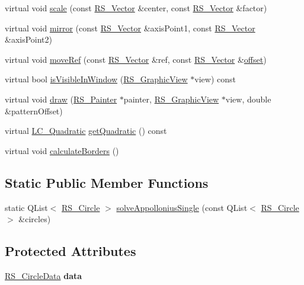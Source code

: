 \begin{DoxyCompactItemize}
\item 
virtual void \hyperlink{classRS__Circle_ae5674bf213371b303ac5db0a2a6128db}{scale} (const \hyperlink{classRS__Vector}{R\-S\-\_\-\-Vector} \&center, const \hyperlink{classRS__Vector}{R\-S\-\_\-\-Vector} \&factor)
\item 
virtual void \hyperlink{classRS__Circle_aa3535334d055f65e597a8c193b17a2a5}{mirror} (const \hyperlink{classRS__Vector}{R\-S\-\_\-\-Vector} \&axis\-Point1, const \hyperlink{classRS__Vector}{R\-S\-\_\-\-Vector} \&axis\-Point2)
\item 
virtual void \hyperlink{classRS__Circle_a642a5aeaaf05fc5b2bce235fb9329d04}{move\-Ref} (const \hyperlink{classRS__Vector}{R\-S\-\_\-\-Vector} \&ref, const \hyperlink{classRS__Vector}{R\-S\-\_\-\-Vector} \&\hyperlink{classRS__Circle_a0dec1d2723496184c23c56a4069f71bd}{offset})
\item 
virtual bool \hyperlink{classRS__Circle_a2c54986be7e370b734b64fd3dd11b8a5}{is\-Visible\-In\-Window} (\hyperlink{classRS__GraphicView}{R\-S\-\_\-\-Graphic\-View} $\ast$view) const 
\item 
virtual void \hyperlink{classRS__Circle_a35fe8b3514323aa5c322a01b3342efe5}{draw} (\hyperlink{classRS__Painter}{R\-S\-\_\-\-Painter} $\ast$painter, \hyperlink{classRS__GraphicView}{R\-S\-\_\-\-Graphic\-View} $\ast$view, double \&pattern\-Offset)
\item 
virtual \hyperlink{classLC__Quadratic}{L\-C\-\_\-\-Quadratic} \hyperlink{classRS__Circle_a4568b832aed8d2ba9643dfc40bee6380}{get\-Quadratic} () const 
\item 
virtual void \hyperlink{classRS__Circle_a1b124ddd6b996fc705611219c9e5c2ad}{calculate\-Borders} ()
\end{DoxyCompactItemize}
\subsection*{Static Public Member Functions}
\begin{DoxyCompactItemize}
\item 
static Q\-List$<$ \hyperlink{classRS__Circle}{R\-S\-\_\-\-Circle} $>$ \hyperlink{classRS__Circle_a8eaaf0873c793dc527e4f7db9c033c05}{solve\-Appollonius\-Single} (const Q\-List$<$ \hyperlink{classRS__Circle}{R\-S\-\_\-\-Circle} $>$ \&circles)
\end{DoxyCompactItemize}
\subsection*{Protected Attributes}
\begin{DoxyCompactItemize}
\item 
\hypertarget{classRS__Circle_a5dcd8d30f45aeb02eea4c45b1e240d35}{\hyperlink{classRS__CircleData}{R\-S\-\_\-\-Circle\-Data} {\bfseries data}}\label{classRS__Circle_a5dcd8d30f45aeb02eea4c45b1e240d35}

\end{DoxyCompactItemize}
